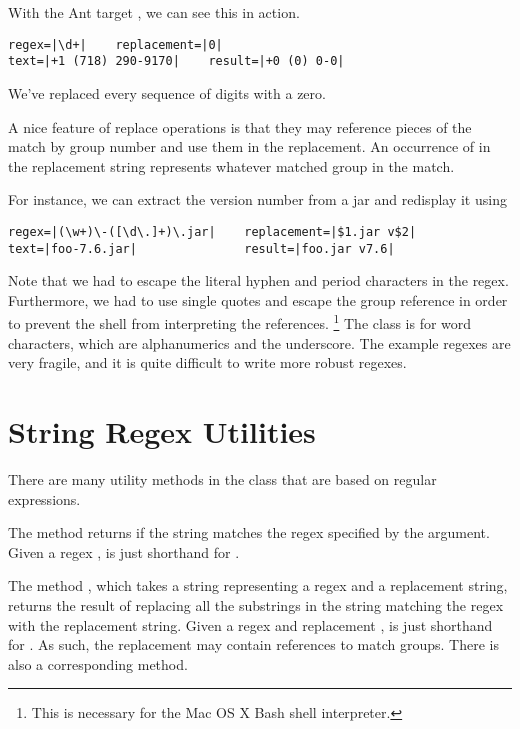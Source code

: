 With the Ant target , we can see this in action.
%

\begin{verbatim}
regex=|\d+|    replacement=|0|    
text=|+1 (718) 290-9170|    result=|+0 (0) 0-0|
\end{verbatim}
%
We've replaced every sequence of digits with a zero.  

A nice feature of replace operations is that they may reference
pieces of the match by group number and use them in the replacement.
An occurrence of  in the replacement string
represents whatever matched group  in the match.

For instance, we can extract the version number from a jar and
redisplay it using
%

\begin{verbatim}
regex=|(\w+)\-([\d\.]+)\.jar|    replacement=|$1.jar v$2|
text=|foo-7.6.jar|               result=|foo.jar v7.6|
\end{verbatim}
%
Note that we had to escape the literal hyphen and period characters in
the regex.  Furthermore, we had to use single quotes and escape the group
reference  in order to prevent the shell from interpreting
the references.%
\footnote{This is necessary for the Mac OS X Bash shell interpreter.}
%
The class  is for word characters, which are
alphanumerics and the underscore.  The example regexes are very
fragile, and it is quite difficult to write more robust regexes.

\section{String Regex Utilities}

There are many utility methods in the  class that
are based on regular expressions.  

The method  returns  if the string
matches the regex specified by the argument.  Given a regex ,
 is just shorthand for
.

The method , which takes a string
representing a regex and a replacement string, returns the result
of replacing all the substrings in the string matching the regex
with the replacement string.  Given a regex  and replacement
,  is just shorthand for
.  As such,
the replacement may contain references to match groups.  There is also
a corresponding  method.

